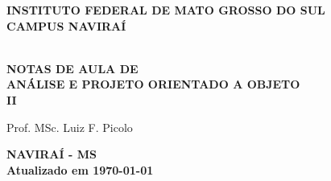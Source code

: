\thispagestyle{empty}

\vfill
 \begin{center}
    
    {\large\bfseries INSTITUTO FEDERAL DE MATO GROSSO DO SUL} \\
    
    {\large\bfseries CAMPUS NAVIRAÍ}  \\ 

    \vspace*{1in}

    \vspace*{4cm}
    \noindent \\
    
    \large\bfseries{NOTAS DE AULA DE} \\
    \huge\bfseries{ANÁLISE E PROJETO ORIENTADO A OBJETO} \\ II
    
    \vspace*{4cm}
    
    \large{Prof. MSc. Luiz F. Picolo}
    
    \vfill
    \large\bfseries{NAVIRAÍ - MS} \\ 
    \vspace{0.2cm}
    \small Atualizado em \today
\end{center}

\normalsize


